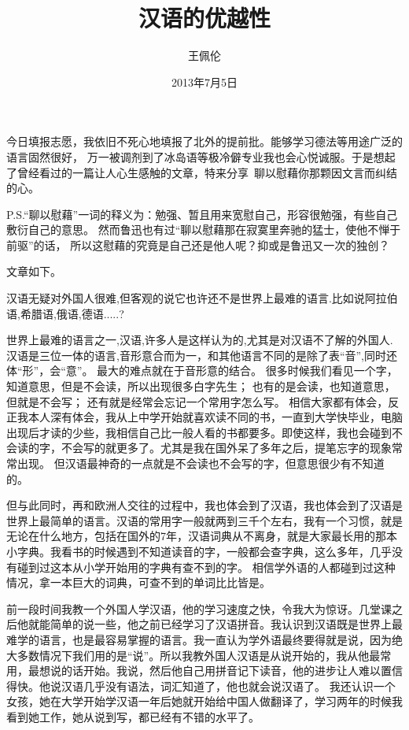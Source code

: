 \documentclass{ctexart}
\title{汉语的优越性}
\author{王佩伦}
\date{2013年7月5日}
\begin{document}
\maketitle

今日填报志愿，我依旧不死心地填报了北外的提前批。能够学习德法等用途广泛的语言固然很好，
万一被调剂到了冰岛语等极冷僻专业我也会心悦诚服。于是想起了曾经看过的一篇让人心生感触的文章，特来分享~聊以慰藉你那颗因文言而纠结的心。

P.S.“聊以慰藉”一词的释义为：勉强、暂且用来宽慰自己，形容很勉强，有些自己敷衍自己的意思。
然而鲁迅也有过“聊以慰藉那在寂寞里奔驰的猛士，使他不惮于前驱”的话，
所以这慰藉的究竟是自己还是他人呢？抑或是鲁迅又一次的独创？

文章如下。

汉语无疑对外国人很难,但客观的说它也许还不是世界上最难的语言.比如说阿拉伯语,希腊语,俄语,德语.....?

世界上最难的语言之一,汉语,许多人是这样认为的,尤其是对汉语不了解的外国人.
汉语是三位一体的语言,音形意合而为一，和其他语言不同的是除了表“音”,同时还体“形”，会“意”。
最大的难点就在于音形意的结合。
很多时候我们看见一个字，知道意思，但是不会读，所以出现很多白字先生；
也有的是会读，也知道意思，但就是不会写；
还有就是经常会忘记一个常用字怎么写。
相信大家都有体会，反正我本人深有体会，我从上中学开始就喜欢读不同的书，一直到大学快毕业，电脑出现后才读的少些，我相信自己比一般人看的书都要多。即使这样，我也会碰到不会读的字，不会写的就更多了。尤其是我在国外呆了多年之后，提笔忘字的现象常常出现。
但汉语最神奇的一点就是不会读也不会写的字，但意思很少有不知道的。

但与此同时，再和欧洲人交往的过程中，我也体会到了汉语，我也体会到了汉语是世界上最简单的语言。汉语的常用字一般就两到三千个左右，我有一个习惯，就是无论在什么地方，包括在国外的7年，汉语词典从不离身，就是大家最长用的那本小字典。我看书的时候遇到不知道读音的字，一般都会查字典，这么多年，几乎没有碰到过这本从小学开始用的字典有查不到的字。
相信学外语的人都碰到过这种情况，拿一本巨大的词典，可查不到的单词比比皆是。

前一段时间我教一个外国人学汉语，他的学习速度之快，令我大为惊讶。几堂课之后他就能简单的说一些，他之前已经学习了汉语拼音。我认识到汉语既是世界上最难学的语言，也是最容易掌握的语言。我一直认为学外语最终要得就是说，因为绝大多数情况下我们用的是“说”。所以我教外国人汉语是从说开始的，我从他最常用，最想说的话开始。我说，然后他自己用拼音记下读音，他的进步让人难以置信得快。他说汉语几乎没有语法，词汇知道了，他也就会说汉语了。
我还认识一个女孩，她在大学开始学汉语一年后她就开始给中国人做翻译了，学习两年的时候我看到她工作，她从说到写，都已经有不错的水平了。
\end{document}
